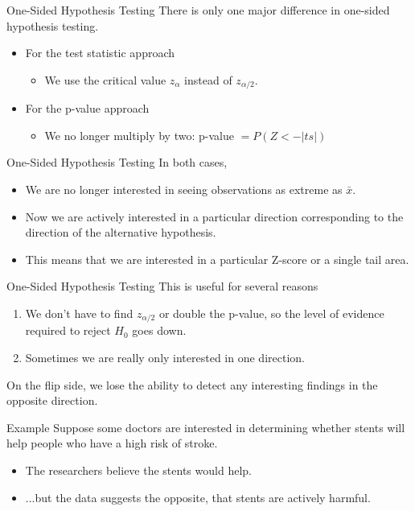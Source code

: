 \begin{frame}{One-Sided Hypothesis Testing}
    There is only one major difference in one-sided hypothesis testing.
    
    \begin{itemize}
        \item For the test statistic approach
        \begin{itemize}
            \item We use the critical value $z_{\alpha}$ instead of $z_{\alpha/2}$.
        \end{itemize}
        \item For the p-value approach
        \begin{itemize}
            \item We no longer multiply by two: p-value $= P(Z < -|ts|)$
        \end{itemize}
    \end{itemize}
\end{frame}

\begin{frame}{One-Sided Hypothesis Testing}
    In both cases,
    \begin{itemize}
        \item We are no longer interested in seeing observations as extreme as $\bar{x}$.
        \item Now we are actively interested in a particular direction corresponding to the direction of the alternative hypothesis.
        \item This means that we are interested in a particular Z-score or a single tail area.
    \end{itemize}
\end{frame}

\begin{frame}{One-Sided Hypothesis Testing}
    This is useful for several reasons
    \begin{enumerate}
        \item We don't have to find $z_{\alpha/2}$ or double the p-value, so the level of evidence required to reject $H_0$ goes down. 
        \item Sometimes we are really only interested in one direction. 
    \end{enumerate}
    On the flip side, we lose the ability to detect any interesting findings in the opposite direction. 
\end{frame}

\begin{frame}{Example}
    Suppose some doctors are interested in determining whether stents will help people who have a high risk of stroke. 
    \begin{itemize}
        \item The researchers believe the stents would help.
        \item ...but the data suggests the opposite, that stents are actively harmful.
    \end{itemize}
\end{frame}

